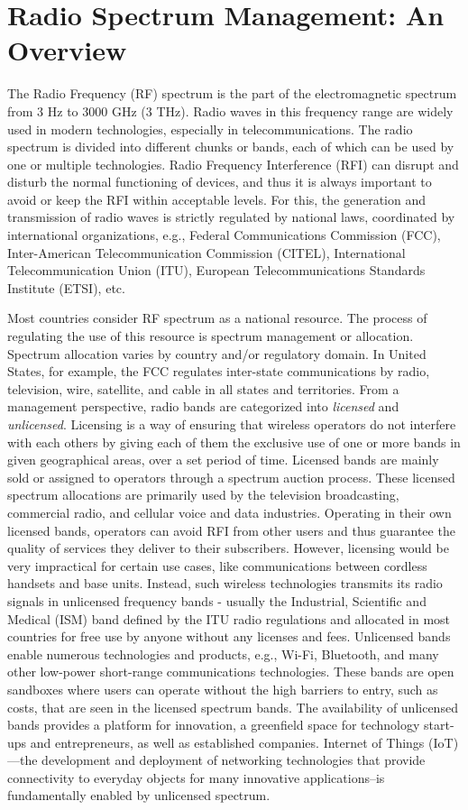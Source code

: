\section{Radio Spectrum Management: An Overview}

The Radio Frequency (RF) spectrum is the part of the electromagnetic spectrum from $3$ Hz to $3000$ GHz ($3$ THz). Radio waves in this frequency range are widely used in modern technologies, especially in telecommunications. The radio spectrum is divided into different chunks or bands, each of which can be used by one or multiple technologies. Radio Frequency Interference (RFI) can disrupt and disturb the normal functioning of devices, and thus it is always important to avoid or keep the RFI within acceptable levels. For this, the generation and transmission of radio waves is strictly regulated by national laws, coordinated by international organizations, e.g., Federal Communications Commission (FCC), Inter-American Telecommunication Commission (CITEL), International Telecommunication Union (ITU), European Telecommunications Standards Institute (ETSI), etc. 

Most countries consider RF spectrum as a national resource. The process of regulating the use of this resource is spectrum management or allocation. Spectrum allocation varies by country and/or regulatory domain. In United States, for example, the FCC regulates inter-state communications by radio, television, wire, satellite, and cable in all states and territories. From a management perspective, radio bands are categorized into \textit{licensed} and \textit{unlicensed}. Licensing is a way of ensuring that wireless operators do not interfere with each others by giving each of them the exclusive use of one or more bands in given geographical areas, over a set period of time. Licensed bands are mainly sold or assigned to operators through  a spectrum auction process. These licensed spectrum allocations are primarily used by the television broadcasting, commercial radio, and cellular voice and data industries. Operating in their own licensed bands, operators can avoid RFI from other users and thus guarantee the quality of services they deliver to their subscribers. However, licensing would be very impractical for certain use cases, like communications between cordless handsets and base units. Instead, such wireless technologies transmits its radio signals in unlicensed frequency bands - usually the Industrial, Scientific and Medical (ISM) band defined by the ITU radio regulations and allocated in most countries for free use by anyone without any licenses and fees. Unlicensed bands enable numerous technologies and products, e.g., \mbox{Wi-Fi}, Bluetooth, and many other low-power short-range communications technologies. These bands are open sandboxes where users can operate without the high barriers to entry, such as costs, that are seen in the licensed spectrum bands. The availability of unlicensed bands provides a platform for innovation, a greenfield space for technology start-ups and entrepreneurs, as well as established companies. Internet of Things (IoT)---the development and deployment of networking technologies that provide connectivity to everyday objects for many innovative applications--is fundamentally enabled by unlicensed spectrum.

